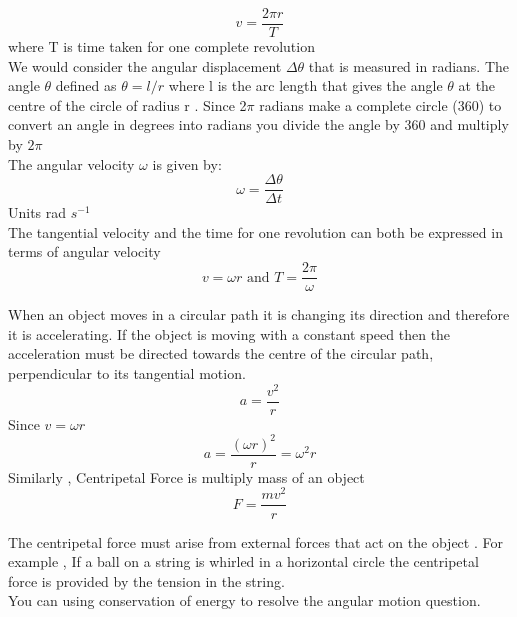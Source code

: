 \documentclass[a4paper]{article}
\begin{document}
\begin{defi}
\begin{equation*}
    v=\frac{2\pi r}{T}
\end{equation*}
where T is time taken for one complete revolution\\

We would consider the angular displacement $\Delta\theta$ that is measured in radians. The angle $\theta$ defined as $\theta=l/r$ where l is the arc length that gives the angle $\theta$ at the centre of the circle of radius r . Since 2$\pi$ radians make a complete circle (360) to convert an angle in degrees into radians you divide the angle by 360 and multiply by $2\pi$\\

The angular velocity $\omega$ is given by:
\begin{equation*}
    \omega=\frac{\Delta\theta}{\Delta t}
\end{equation*}
Units rad $s^{-1}$\\

The tangential velocity and the time for one revolution can both be expressed in terms of angular velocity
\begin{equation*}
    v=\omega r \mbox{~and~} T=\frac{2\pi}{\omega}
\end{equation*}

\end{defi}

\begin{defi}
When an object moves in a circular path it is changing its direction and therefore it is accelerating. If the object is moving with a constant speed then the acceleration must be directed towards the centre of the circular path, perpendicular to its tangential motion.
\begin{equation*}
    a=\frac{v^2}{r}
\end{equation*}
Since $v=\omega r$
\begin{equation*}
    a=\frac{(\omega r)^2}{r}=\omega^2r
\end{equation*}
Similarly , Centripetal Force is multiply mass of an object 
\begin{equation*}
    F=\frac{mv^2}{r}
\end{equation*}

The centripetal force must arise from external forces that act on the object . For example , If a ball on a string is whirled in a horizontal circle the centripetal force is provided by the tension in the string.\\

You can using conservation of energy to resolve the angular motion question.

\end{defi}
\end{document}
